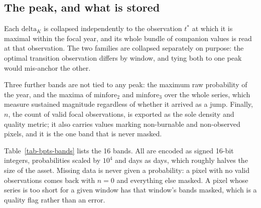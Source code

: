 \documentclass[11pt,a4paper]{article}
\begin{document}
\subsection{The peak, and what is stored}

Each \(\mathrm{delta}_K\) is collapsed independently to the observation \(t^{*}\) at which it is
maximal within the focal year, and its whole bundle of companion values is read at that
observation. The two families are collapsed separately on purpose: the optimal transition
observation differs by window, and tying both to one peak would mis-anchor the other.

Three further bands are not tied to any peak: the maximum raw probability of the year, and the
maxima of \(\mathrm{minfore}_2\) and \(\mathrm{minfore}_3\) over the whole series, which measure
sustained magnitude regardless of whether it arrived as a jump. Finally, \(n\), the count of valid
focal observations, is exported as the sole density and quality metric; it also carries
values marking non-burnable and non-observed pixels, and it is the one band that is never masked.

Table~\ref{tab-bpts-bands} lists the 16 bands. All are encoded as signed 16-bit integers,
probabilities scaled by \(10^4\) and days as days, which roughly halves the size of the asset.
Missing data is never given a probability: a pixel with no valid observations comes back with
\(n = 0\) and everything else masked. A pixel whose series is too short for a given window has that
window's bands masked, which is a quality flag rather than an error.
\end{document}
